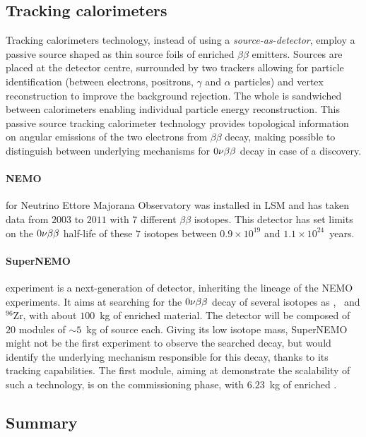 \subsection{Tracking calorimeters}
\label{subsec:trackocalo}
Tracking calorimeters technology, instead of using a \emph{source-as-detector}, employ a passive source shaped as thin source foils of enriched $\beta\beta$ emitters.
Sources are placed at the detector centre, surrounded by two trackers allowing for particle identification (between electrons, positrons, $\gamma$ and $\alpha$ particles) and vertex reconstruction to improve the background rejection.
The whole is sandwiched between calorimeters enabling individual particle energy reconstruction.
This passive source tracking calorimeter technology provides topological information on angular emissions of the two electrons from $\beta\beta$ decay, making possible to distinguish between underlying mechanisms for $0\nu\beta\beta$ decay in case of a discovery.

\paragraph{NEMO} for Neutrino Ettore Majorana Observatory was installed in LSM and has taken data from $2003$ to $2011$ with $7$ different $\beta\beta$ isotopes.
This detector has set limits on the $0\nu\beta\beta$ half-life of these $7$ isotopes between $0.9\times 10^{19}$ and $1.1\times 10^{24}$~years.

\paragraph{SuperNEMO} experiment is a next-generation of detector, inheriting the lineage of the NEMO experiments.
It aims at searching for the $0\nu\beta\beta$ decay of several isotopes as \Se, \Nd\ and $^{96}$Zr, with about $100$~kg of enriched material.
The detector will be composed of $20$ modules of $\sim 5$~kg of source each.
Giving its low isotope mass, SuperNEMO might not be the first experiment to observe the searched decay, but would identify the underlying mechanism responsible for this decay, thanks to its tracking capabilities.
The first module, aiming at demonstrate the scalability of such a technology, is on the commissioning phase, with $6.23$~kg of enriched \Se.

\subsection{Summary}


